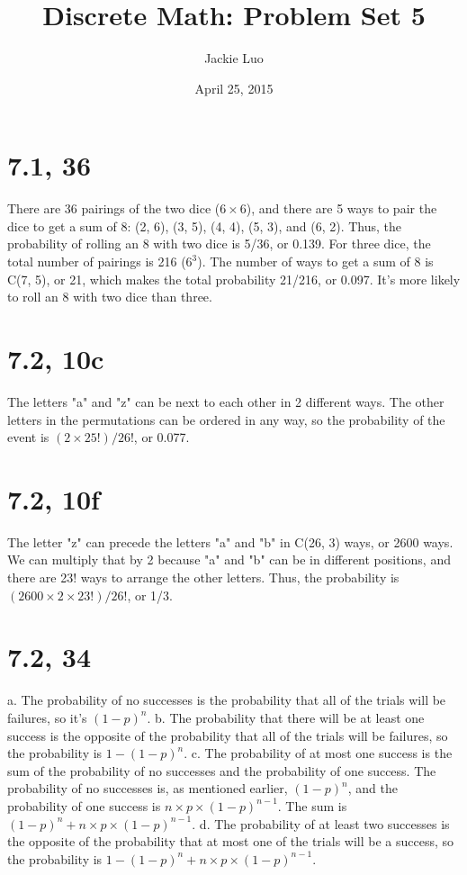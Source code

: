 \documentclass{article}
\title{Discrete Math: Problem Set 5}
\author{Jackie Luo}
\date{April 25, 2015}
\begin{document}
\maketitle

\section{7.1, 36}
There are 36 pairings of the two dice ($6 \times 6$), and there are 5 ways to pair the dice to get a sum of 8: (2, 6), (3, 5), (4, 4), (5, 3), and (6, 2). Thus, the probability of rolling an 8 with two dice is 5/36, or 0.139. For three dice, the total number of pairings is 216 ($6^3$). The number of ways to get a sum of 8 is C(7, 5), or 21, which makes the total probability 21/216, or 0.097. It's more likely to roll an 8 with two dice than three.

\section{7.2, 10c}
The letters "a" and "z" can be next to each other in 2 different ways. The other letters in the permutations can be ordered in any way, so the probability of the event is $(2 \times 25!)/26!$, or 0.077.

\section{7.2, 10f}
The letter "z" can precede the letters "a" and "b" in C(26, 3) ways, or 2600 ways. We can multiply that by 2 because "a" and "b" can be in different positions, and there are 23! ways to arrange the other letters. Thus, the probability is $(2600 \times 2 \times 23!)/26!$, or 1/3.

\section{7.2, 34}
a. The probability of no successes is the probability that all of the trials will be failures, so it's $(1 - p)^n$.
\newline
b. The probability that there will be at least one success is the opposite of the probability that all of the trials will be failures, so the probability is $1 - (1 - p)^n$.
\newline
c. The probability of at most one success is the sum of the probability of no successes and the probability of one success. The probability of no successes is, as mentioned earlier, $(1 - p)^n$, and the probability of one success is $n \times p \times (1 - p)^{n - 1}$. The sum is $(1 - p)^n + n \times p \times (1 - p)^{n - 1}$.
\newline
d. The probability of at least two successes is the opposite of the probability that at most one of the trials will be a success, so the probability is $1 - (1 - p)^n + n \times p \times (1 - p)^{n - 1}$.
\end{document}

